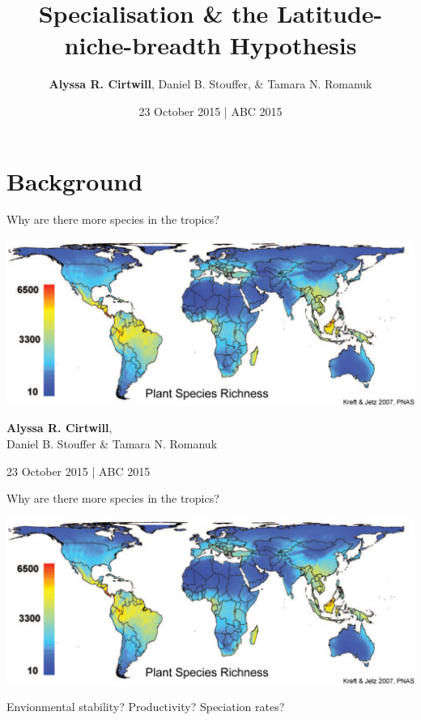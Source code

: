 \documentclass{beamer}
\title[Specialisation \& the Latitude-niche-breadth Hypothesis]
{Specialisation \& the Latitude-niche-breadth Hypothesis}
\author[A.R. Cirtwill, D.B. Stouffer, \& T.N. Romanuk]{\textbf{Alyssa R. Cirtwill}, Daniel B. Stouffer, \& Tamara N. Romanuk}
\institute[]
{
  Stouffer Lab\\
  School of Biological Sciences\\
  University of Canterbury\\
  Christchurch, New Zealand\\
  ~\\
  www.stoufferlab.org\\
}
\date[Short Occasion] 
{23 October 2015 | ABC 2015}
\begin{document}

\section*{Background}

  \begin{frame}{Why are there more species in the tropics?}

    \begin{center}
      \includegraphics*[width=.8\textwidth]{Figures/plant_richness.eps}

      \vspace{1cm}

    \textbf{Alyssa R. Cirtwill},\\ Daniel B. Stouffer \& Tamara N. Romanuk

    \vspace{1cm}

    23 October 2015 | ABC 2015

    \end{center}
  \end{frame}


  \begin{frame}{Why are there more species in the tropics?}

    \begin{center}
      \includegraphics*[width=.8\textwidth]{Figures/plant_richness.eps}

      \vspace{.5cm}

      {\color{white}{\Large Latitude-Niche Breadth Hypothesis}}

      \vspace{.5cm}

      Envionmental stability? 
      Productivity? 
      Speciation rates?

      \vspace{1cm}

    \end{center}
  \end{frame}
\end{document}
